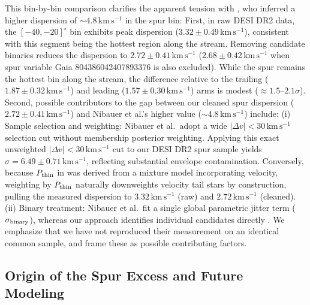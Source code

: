 \documentclass[twocolumn]{aastex631}
\begin{document}
This bin-by-bin comparison clarifies the apparent tension with \citet{Nibauer2026}, who inferred a higher dispersion of $\sim 4.8\,\mathrm{km\,s^{-1}}$ in the spur bin:
First, in raw DESI DR2 data, the $[-40, -20]^\circ$ bin exhibits peak dispersion ($3.32 \pm 0.49\,\mathrm{km\,s^{-1}}$), consistent with this segment being the hottest region along the stream. Removing candidate binaries reduces the dispersion to $2.72 \pm 0.41\,\mathrm{km\,s^{-1}}$ ($2.68 \pm 0.42\,\mathrm{km\,s^{-1}}$ when spur variable Gaia 804386042407893376 is also excluded). While the spur remains the hottest bin along the stream, the difference relative to the trailing ($1.87 \pm 0.32\,\mathrm{km\,s^{-1}}$) and leading ($1.57 \pm 0.30\,\mathrm{km\,s^{-1}}$) arms is modest ($\approx 1.5\text{--}2.1\sigma$).
Second, possible contributors to the gap between our cleaned spur dispersion ($2.72 \pm 0.41\,\mathrm{km\,s^{-1}}$) and Nibauer et al.'s higher value ($\sim 4.8\,\mathrm{km\,s^{-1}}$) include: (i) Sample selection and weighting: Nibauer et al.\ adopt a wide $|\Delta v| < 30\,\mathrm{km\,s^{-1}}$ selection cut without membership posterior weighting. Applying this exact unweighted $|\Delta v| < 30\,\mathrm{km\,s^{-1}}$ cut to our DESI DR2 spur sample yields $\sigma = 6.49 \pm 0.71\,\mathrm{km\,s^{-1}}$, reflecting substantial envelope contamination. Conversely, because $P_{\rm thin}$ in \citet{Jarvis2026} was derived from a mixture model incorporating velocity, weighting by $P_{\rm thin}$ naturally downweights velocity tail stars by construction, pulling the measured dispersion to $3.32\,\mathrm{km\,s^{-1}}$ (raw) and $2.72\,\mathrm{km\,s^{-1}}$ (cleaned). (ii) Binary treatment: Nibauer et al.\ fit a single global parametric jitter term ($\sigma_{\rm binary}$), whereas our approach identifies individual candidates directly \citep[see][for stream binary modeling]{Phillips2026}. We emphasize that we have not reproduced their measurement on an identical common sample, and frame these as possible contributing factors.

\subsection{Origin of the Spur Excess and Future Modeling}
\label{sec:spur_origin}
\end{document}
